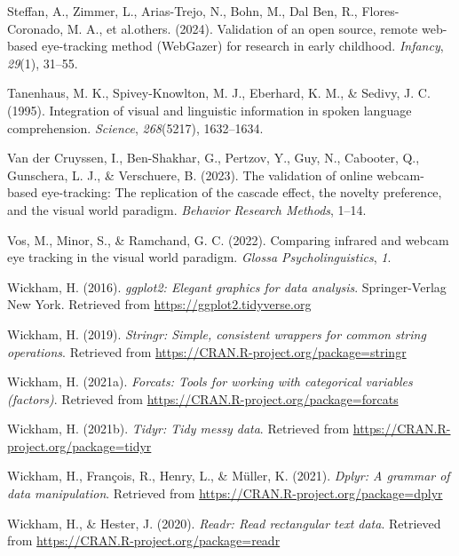 \documentclass[
  man,floatsintext]{apa6}
\newlength{\cslhangindent}
\newenvironment{CSLReferences}[2] %
 {\begin{list}{}{%
  \setlength{\itemindent}{0pt}
  \setlength{\leftmargin}{0pt}
  \setlength{\parsep}{0pt}
  \ifodd #1
   \setlength{\leftmargin}{\cslhangindent}
   \setlength{\itemindent}{-1\cslhangindent}
  \fi
  \setlength{\itemsep}{#2\baselineskip}}}
 {\end{list}}
\begin{document}
\begin{CSLReferences}{1}{0}
Steffan, A., Zimmer, L., Arias-Trejo, N., Bohn, M., Dal Ben, R., Flores-Coronado, M. A., et al.others. (2024). Validation of an open source, remote web-based eye-tracking method (WebGazer) for research in early childhood. \emph{Infancy}, \emph{29}(1), 31--55.

Tanenhaus, M. K., Spivey-Knowlton, M. J., Eberhard, K. M., \& Sedivy, J. C. (1995). Integration of visual and linguistic information in spoken language comprehension. \emph{Science}, \emph{268}(5217), 1632--1634.

Van der Cruyssen, I., Ben-Shakhar, G., Pertzov, Y., Guy, N., Cabooter, Q., Gunschera, L. J., \& Verschuere, B. (2023). The validation of online webcam-based eye-tracking: The replication of the cascade effect, the novelty preference, and the visual world paradigm. \emph{Behavior Research Methods}, 1--14.

Vos, M., Minor, S., \& Ramchand, G. C. (2022). Comparing infrared and webcam eye tracking in the visual world paradigm. \emph{Glossa Psycholinguistics}, \emph{1}.

Wickham, H. (2016). \emph{ggplot2: Elegant graphics for data analysis}. Springer-Verlag New York. Retrieved from \url{https://ggplot2.tidyverse.org}

Wickham, H. (2019). \emph{Stringr: Simple, consistent wrappers for common string operations}. Retrieved from \url{https://CRAN.R-project.org/package=stringr}

Wickham, H. (2021a). \emph{Forcats: Tools for working with categorical variables (factors)}. Retrieved from \url{https://CRAN.R-project.org/package=forcats}

Wickham, H. (2021b). \emph{Tidyr: Tidy messy data}. Retrieved from \url{https://CRAN.R-project.org/package=tidyr}

Wickham, H., François, R., Henry, L., \& Müller, K. (2021). \emph{Dplyr: A grammar of data manipulation}. Retrieved from \url{https://CRAN.R-project.org/package=dplyr}

Wickham, H., \& Hester, J. (2020). \emph{Readr: Read rectangular text data}. Retrieved from \url{https://CRAN.R-project.org/package=readr}


\end{CSLReferences}
\end{document}
